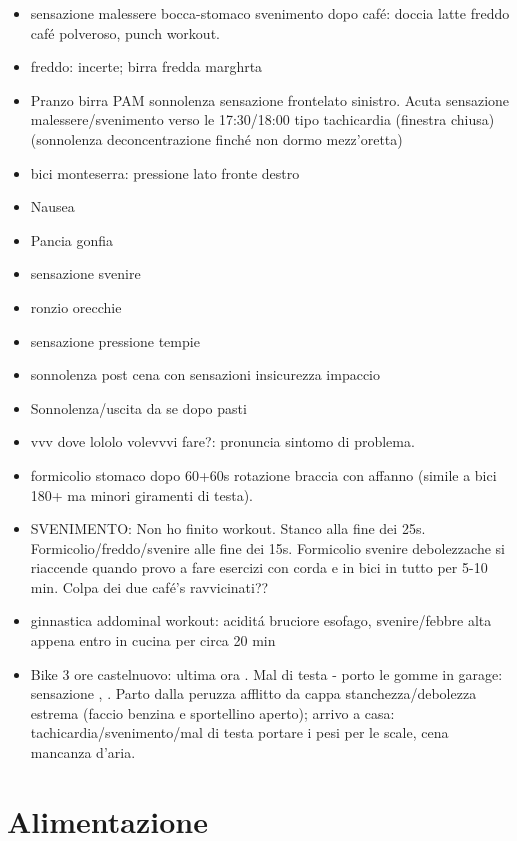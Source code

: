 \begin{itemize}
\item sensazione malessere bocca-stomaco svenimento dopo caf\'e: doccia latte freddo caf\'e polveroso, punch workout.
\item freddo:  incerte; birra fredda  marghrta
\item Pranzo birra PAM sonnolenza sensazione frontelato sinistro. Acuta sensazione malessere/svenimento verso le 17:30/18:00 tipo tachicardia (finestra chiusa) (sonnolenza deconcentrazione finch\'e non dormo mezz'oretta)
\item bici monteserra: pressione lato fronte destro
\item Nausea
\item Pancia gonfia
\item sensazione svenire
\item ronzio orecchie
\item sensazione pressione tempie
\item sonnolenza post cena con sensazioni insicurezza impaccio
\item Sonnolenza/uscita da se dopo pasti
\item vvv dove lololo volevvvi fare?: pronuncia sintomo di problema.
\item formicolio stomaco dopo 60+60s rotazione braccia con affanno (simile a bici 180+ ma minori giramenti di testa).
\item SVENIMENTO: Non ho finito workout. Stanco alla fine dei 25s. Formicolio/freddo/svenire alle fine dei 15s. Formicolio svenire debolezzache si riaccende quando provo a fare esercizi con corda e in bici in tutto per 5-10 min.
Colpa dei due caf\'e's ravvicinati??
\item ginnastica addominal workout: acidit\'a bruciore esofago, svenire/febbre alta appena entro in cucina per circa 20 min
\item Bike 3 ore castelnuovo: ultima ora . Mal di testa - porto le gomme in garage: sensazione , . Parto dalla peruzza afflitto da cappa stanchezza/debolezza estrema (faccio benzina e  sportellino aperto); arrivo a casa: tachicardia/svenimento/mal di testa portare i pesi per le scale, cena mancanza d'aria.
\end{itemize}

\section{Alimentazione}

